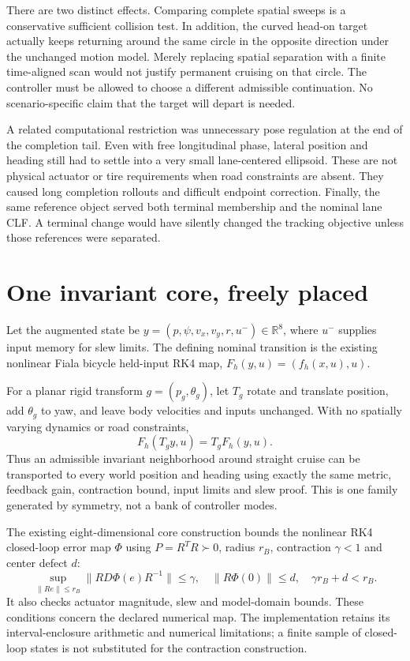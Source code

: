 \documentclass[11pt]{article}
\begin{document}
There are two distinct effects. Comparing complete spatial sweeps is a
conservative sufficient collision test. In addition, the curved head-on target
actually keeps returning around the same circle in the opposite direction
under the unchanged motion model. Merely replacing spatial separation with a
finite time-aligned scan would not justify permanent cruising on that circle.
The controller must be allowed to choose a different admissible continuation.
No scenario-specific claim that the target will depart is needed.

A related computational restriction was unnecessary pose regulation at the
end of the completion tail. Even with free longitudinal phase, lateral
position and heading still had to settle into a very small lane-centered
ellipsoid. These are not physical actuator or tire requirements when road
constraints are absent. They caused long completion rollouts and difficult
endpoint correction. Finally, the same reference object served both terminal
membership and the nominal lane CLF. A terminal change would have silently
changed the tracking objective unless those references were separated.

\section{One invariant core, freely placed}
Let the augmented state be $y=(p,\psi,v_x,v_y,r,u^{-})\in\mathbb R^8$,
where $u^{-}$ supplies input memory for slew limits. The defining nominal
transition is the existing nonlinear Fiala bicycle held-input RK4 map,
$F_h(y,u)=(f_h(x,u),u)$.

For a planar rigid transform $g=(p_g,\theta_g)$, let $T_g$ rotate and translate
position, add $\theta_g$ to yaw, and leave body velocities and inputs unchanged.
With no spatially varying dynamics or road constraints,
\[
F_h(T_g y,u)=T_g F_h(y,u).
\]
Thus an admissible invariant neighborhood around straight cruise can be
transported to every world position and heading using exactly the same metric,
feedback gain, contraction bound, input limits and slew proof. This is one
family generated by symmetry, not a bank of controller modes.

The existing eight-dimensional core construction bounds the nonlinear RK4
closed-loop error map $\Phi$ using $P=R^TR\succ0$, radius $r_B$, contraction
$\gamma<1$ and center defect $d$:
\[
\sup_{\|Re\|\le r_B}\|R D\Phi(e)R^{-1}\|\le\gamma,
\quad\|R\Phi(0)\|\le d,
\quad\gamma r_B+d<r_B.
\]
It also checks actuator magnitude, slew and model-domain bounds. These
conditions concern the declared numerical map. The implementation retains
its interval-enclosure arithmetic and numerical limitations; a finite sample
of closed-loop states is not substituted for the contraction construction.
\end{document}
